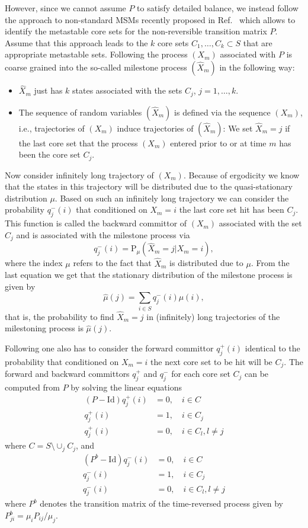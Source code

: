 \documentclass[aps, pre, preprint,unsortedaddress,a4paper,onecolumn]{revtex4}
\newcommand{\fwd}[0]{+}
\newcommand{\bwd}[0]{-}
\newcommand{\id}{\mathrm{Id}}
\newcommand{\prob}{\textrm{P}}
\begin{document}
However, since we cannot assume $P$ to satisfy detailed balance, we
instead follow the approach to non-standard MSMs recently proposed in Ref.~\cite{sarich2014utilizing} which allows to identify the metastable core sets for the
non-reversible transition matrix $P$. Assume that this approach leads
to the $k$ core sets $C_1,\ldots, C_k\subset S$ that are appropriate metastable sets. 
Following \cite{A19-31,schuette2011markov} the process $(X_m)$ associated with $P$ is coarse grained into the so-called milestone process $(\hat{X}_m)$ in the following way: 
\begin{itemize}
\item $\hat{X}_m$ just has $k$ states associated with the sets $C_j$, $j=1,\ldots,k$. 
\item The sequence of random variables $(\hat{X}_m)$ is defined via the sequence $(X_m)$, i.e., trajectories of $(X_m)$ induce trajectories of $(\hat{X}_m)$: We set $\hat{X}_m=j$ if the last core set that the process $(X_m)$ entered prior to or at time $m$ has been the core set $C_j$.
\end{itemize}
Now consider infinitely long trajectory of $(X_m)$. Because of ergodicity we know that the states in this trajectory will be distributed due to the quasi-stationary distribution $\mu$. Based on such an infinitely long trajectory we can consider the probability $q_j^\bwd(i)$ that conditioned on $X_m=i$ the last core set hit has been $C_j$.
This function is called the backward committor of $(X_m)$ associated with the set $C_j$ and is associated with the milestone process via
\[
q^\bwd_j(i)=\prob_\mu(\hat{X}_m=j|X_m=i),
\] 
where  the index $\mu$ refers to the fact that $\hat{X}_m$ is distributed due to $\mu$.
From the last equation we get that the stationary distribution of the milestone process is given by
\[
\hat{\mu}(j)=\sum_{i\in S} q^\bwd_j(i)\mu(i),
\]
that is, the probability to find $\hat{X}_m=j$ in (infinitely) long trajectories of the milestoning process is $\hat{\mu}(j)$.

Following \cite{discreteTPT} one also has to consider the forward committor $q^\fwd_j(i)$ identical to the probability  that conditioned on $X_m=i$ the next core set to be hit will be $C_j$.
The forward and backward committors $q^\fwd_j$ and $q^\bwd_j$  for each core set $C_j$ can be computed from $P$ by solving the linear equations \cite{discreteTPT}
\begin{align}
(P-\id) q^\fwd_j(i) & =  0, \quad i\in C\label{qfwd}\\
q^\fwd_j(i) & =  1,\quad i\in C_j\nonumber\\
q^\fwd_j(i) & =  0,\quad i\in C_l,l\not=j\nonumber
\end{align}
where $C=S\setminus\cup_j C_j$, and
\begin{align}
(P^b-\id) q^\bwd_j(i) & =  0, \quad i\in C\label{qbwd}\\
q^\bwd_j(i) & =  1,\quad i\in C_j\nonumber \\
q^\bwd_j(i) & =  0,\quad i\in C_l,l\not=j\nonumber
\end{align}
where $P^b$ denotes the transition matrix of the time-reversed process
given by $P^b_{ji}=\mu_i P_{ij}/\mu_j$.
\end{document}
